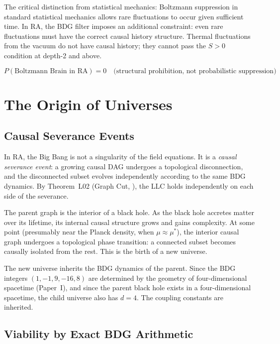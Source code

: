 \documentclass[12pt,a4paper]{article}
\begin{document}
The critical distinction from statistical mechanics: Boltzmann suppression in standard statistical mechanics allows rare fluctuations to occur given sufficient time.  In RA, the BDG filter imposes an additional constraint: even rare fluctuations must have the correct causal history structure.  Thermal fluctuations from the vacuum do not have causal history; they cannot pass the $S>0$ condition at depth-2 and above.

\begin{equation}
  P(\text{Boltzmann Brain in RA}) = 0 \quad \text{(structural prohibition, not probabilistic suppression)}
  \label{eq:BB}
\end{equation}

\section{The Origin of Universes}\label{sec:seeds}

\subsection{Causal Severance Events}

In RA, the Big Bang is not a singularity of the field equations.  It is a \emph{causal severance event}: a growing causal DAG undergoes a topological disconnection, and the disconnected subset evolves independently according to the same BDG dynamics.  By Theorem~L02 (Graph Cut, \statusLV), the LLC holds independently on each side of the severance.

The parent graph is the interior of a black hole.  As the black hole accretes matter over its lifetime, its internal causal structure grows and gains complexity.  At some point (presumably near the Planck density, when $\mu\approx\mu^*$), the interior causal graph undergoes a topological phase transition: a connected subset becomes causally isolated from the rest.  This is the birth of a new universe.

The new universe inherits the BDG dynamics of the parent.  Since the BDG integers $(1,-1,9,-16,8)$ are determined by the geometry of four-dimensional spacetime (Paper~I), and since the parent black hole exists in a four-dimensional spacetime, the child universe also has $d=4$.  The coupling constants are inherited.

\subsection{Viability by Exact BDG Arithmetic}
\end{document}
